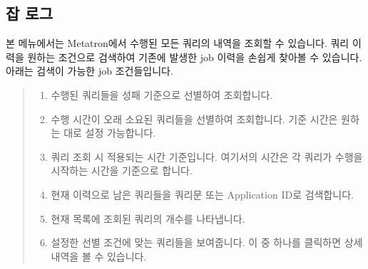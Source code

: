 \documentclass[letterpaper,10pt,english]{sphinxmanual}
\begin{document}
\subsection{잡 로그}
\label{\detokenize{discovery/part02/data_monitoring:id3}}
본 메뉴에서는 Metatron에서 수행된 모든 쿼리의 내역을 조회할 수 있습니다. 쿼리 이력을 원하는 조건으로 검색하여 기존에 발생한 job 이력을 손쉽게 찾아볼 수 있습니다. 아래는 검색이 가능한 job 조건들입니다.
\begin{quote}

\begin{figure}[H]
\centering

\noindent{}
\end{figure}
\begin{enumerate}
\def\theenumi{\arabic{enumi}}
\def\labelenumi{\theenumi .}
\makeatletter\def\p@enumii{\p@enumi \theenumi .}\makeatother
\item {} 
 수행된 쿼리들을 성패 기준으로 선별하여 조회합니다.

\item {} 
 수행 시간이 오래 소요된 쿼리들을 선별하여 조회합니다. 기준 시간은 원하는 대로 설정 가능합니다.

\item {} 
 쿼리 조회 시 적용되는 시간 기준입니다. 여기서의 시간은 각 쿼리가 수행을 시작하는 시간을 기준으로 합니다.

\item {} 
 현재 이력으로 남은 쿼리들을 쿼리문 또는 Application ID로 검색합니다.

\item {} 
 현재 목록에 조회된 쿼리의 개수를 나타냅니다.

\item {} 
 설정한 선별 조건에 맞는 쿼리들을 보여줍니다. 이 중 하나를 클릭하면 상세 내역을 볼 수 있습니다.

\end{enumerate}
\end{quote}
\end{document}
